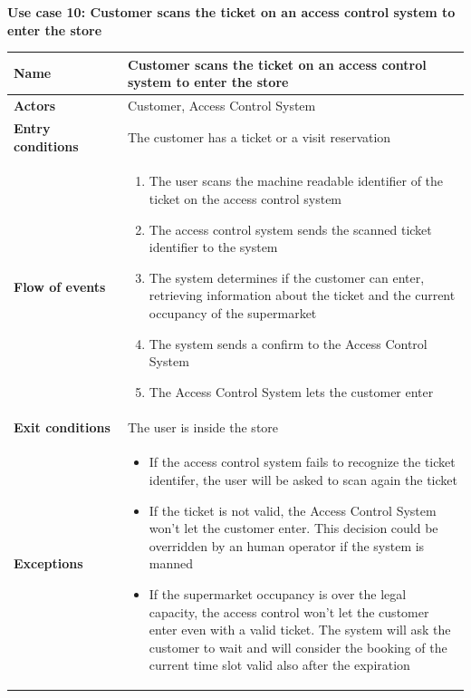 \clearpage
\textbf{Use case 10: Customer scans the ticket on an access control system to enter the store}
\smallskip
{}
\begin{longtable}{p{0.25\linewidth}p{0.75\linewidth}}
    \toprule
    \textbf{Name}                               & \textbf{Customer scans the ticket on an access control system to enter the store} \\
    \midrule
    \textbf{Actors}                             & Customer, Access Control System                                                   \\
    \midrule
    \textbf{Entry conditions}                   & The customer has a ticket or a visit reservation                                  \\
    \midrule
    \textbf{Flow of events}                     &
    \begin{enumerate}
        \item The user scans the machine readable identifier of the ticket on the access control system
        \item The access control system sends the scanned ticket identifier to the system
        \item The system determines if the customer can enter, retrieving information about the ticket and the current occupancy of the supermarket
        \item The system sends a confirm to the Access Control System
        \item The Access Control System lets the customer enter
    \end{enumerate}                                                                                                      \\
    \midrule
    \textbf{Exit conditions}                    & The user is inside the store                                                      \\
    \midrule
    \textbf{Exceptions}                         &
    \begin{itemize}
        \item If the access control system fails to recognize the ticket identifer, the user will be asked to scan again the ticket
        \item If the ticket is not valid, the Access Control System won't let the customer enter. This decision could be overridden by an human operator if the system is manned
        \item If the supermarket occupancy is over the legal capacity, the access control won't let the customer enter even with a valid ticket. The system will ask the customer to wait and will consider the booking of the current time slot valid also after the expiration

\end{itemize}
\end{longtable}

